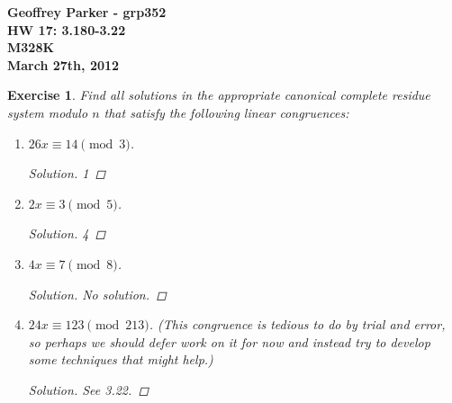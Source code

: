 \documentclass[12pt,leqno]{article}
\numberwithin{equation}{section}
\newtheorem{exer}[thm]{Exercise}
\theoremstyle{definition}
\begin{document}
\thispagestyle{plain}
\begin{flushright}
\large{\textbf{Geoffrey Parker - grp352 \\
HW 17: 3.180-3.22\\
M328K \\
March 27th, 2012 \\}}
\end{flushright}

\markboth{}{} \setcounter{section}{0} \baselineskip=18pt

\setcounter{tocdepth}{4}



\setcounter{section}{3}

\setcounter{thm}{17}

\begin{exer}
Find all solutions in the appropriate canonical complete residue
system modulo $n$ that satisfy the following linear congruences:
\begin{enumerate}
\item $26x \equiv 14 \pmod{3}$.
\begin{proof}[Solution]
1
\end{proof}
\item $2x \equiv 3 \pmod{5}$.
\begin{proof}[Solution]
4
\end{proof}
\item $4x \equiv 7 \pmod{8}$.
\begin{proof}[Solution]
No solution.
\end{proof}
\item $24x \equiv 123 \pmod{213}$. (This congruence is tedious to do by
trial and error, so perhaps we should defer work on it for now and
instead try to develop some techniques that might help.)
\begin{proof}[Solution]
See 3.22.
\end{proof}
\end{enumerate}
\end{exer}
\end{document}

